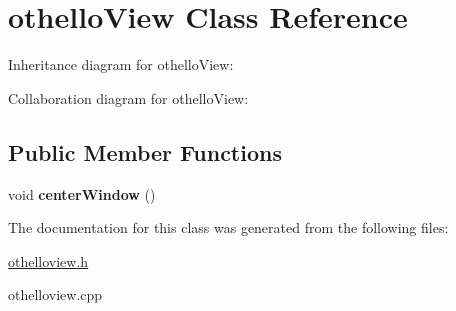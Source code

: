 \hypertarget{classothelloView}{}\section{othello\+View Class Reference}
\label{classothelloView}


Inheritance diagram for othello\+View\+:


Collaboration diagram for othello\+View\+:
\subsection*{Public Member Functions}
\begin{DoxyCompactItemize}
\item 
\mbox{\label{classothelloView_a35aa1d98ae21fd98538ec5b98a5922e9}} 
void {\bfseries center\+Window} ()
\end{DoxyCompactItemize}


The documentation for this class was generated from the following files\+:\begin{DoxyCompactItemize}
\item 
\hyperlink{othelloview_8h}{othelloview.\+h}\item 
othelloview.\+cpp\end{DoxyCompactItemize}
